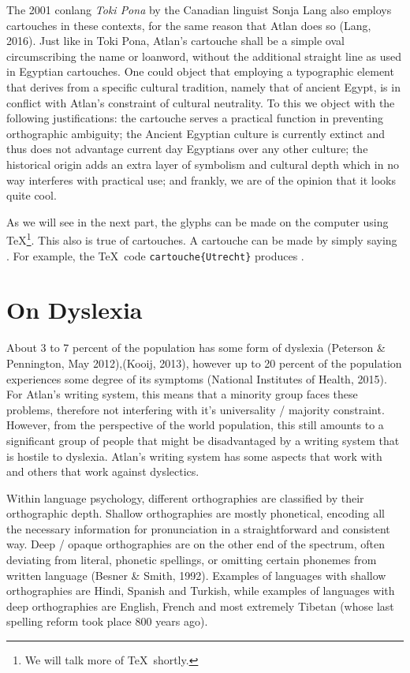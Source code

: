 The 2001 conlang {\it Toki Pona} by the Canadian linguist Sonja Lang also employs cartouches in these contexts, for the same reason that Atlan does so (Lang, 2016). Just like in Toki Pona, Atlan’s cartouche shall be a simple oval circumscribing the name or loanword, without the additional straight line as used in Egyptian cartouches. One could object that employing a typographic element that derives from a specific cultural tradition, namely that of ancient Egypt, is in conflict with Atlan’s constraint of cultural neutrality. To this we object with the following justifications: the cartouche serves a practical function in preventing orthographic ambiguity; the Ancient Egyptian culture is currently extinct and thus does not advantage current day Egyptians over any other culture; the historical origin adds an extra layer of symbolism and cultural depth which in no way interferes with practical use; and frankly, we are of the opinion that it looks quite cool. 

As we will see in the next part, the glyphs can be made on the computer using \TeX\footnote{We will talk more of \TeX\ shortly.}. This also is true of cartouches. A cartouche can be made by simply saying . For example, the \TeX\ code  {\tt {}cartouche\{Utrecht\}} produces \footnotemark.


 


\section{On Dyslexia }

About 3 to 7 percent of the population has some form of dyslexia (Peterson \& Pennington, May 2012),(Kooij, 2013), however up to 20 percent of the population experiences some degree of its symptoms (National Institutes of Health, 2015). For Atlan’s writing system, this means that a minority group faces these problems, therefore not interfering with it’s universality / majority constraint. However, from the perspective of the world population, this still amounts to a significant group of people that might be disadvantaged by a writing system that is hostile to dyslexia. Atlan’s writing system has some aspects that work with and others that work against dyslectics.  

Within language psychology, different orthographies are classified by their orthographic depth. Shallow orthographies are mostly phonetical, encoding all the necessary information for pronunciation in a straightforward and consistent way. Deep / opaque orthographies are on the other end of the spectrum, often deviating from literal, phonetic spellings, or omitting certain phonemes from written language (Besner \& Smith, 1992). Examples of languages with shallow orthographies are Hindi, Spanish and Turkish, while examples of languages with deep orthographies are English, French and most extremely Tibetan (whose last spelling reform took place 800 years ago).  

